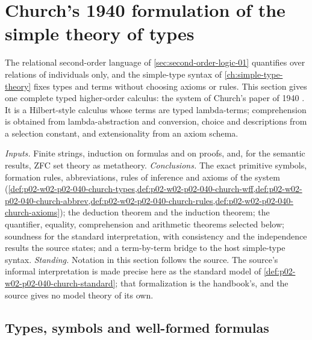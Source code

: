 \section{Church's 1940 formulation of the simple theory of types}
\label{sec:p02-w02-p02-040-church}

The relational second-order language of
\cref{sec:second-order-logic-01} quantifies over relations of individuals
only, and the simple-type syntax of \cref{ch:simple-type-theory} fixes types
and terms without choosing axioms or rules.  This section gives one complete
typed higher-order calculus: the system of Church's paper of 1940
\cite{Church1940}.  It is a Hilbert-style calculus whose terms are typed
lambda-terms; comprehension is obtained from lambda-abstraction and
conversion, choice and descriptions from a selection constant, and
extensionality from an axiom schema.

\emph{Inputs.}  Finite strings, induction on formulas and on proofs, and, for the
semantic results, ZFC set theory as metatheory.
\emph{Conclusions.}  The exact primitive symbols, formation rules,
abbreviations, rules of inference and axioms of the system
(\cref{def:p02-w02-p02-040-church-types,def:p02-w02-p02-040-church-wff,def:p02-w02-p02-040-church-abbrev,def:p02-w02-p02-040-church-rules,def:p02-w02-p02-040-church-axioms});
the deduction theorem and the induction theorem; the quantifier, equality,
comprehension and arithmetic theorems selected below; soundness for the
standard interpretation, with consistency and the independence results
the source states; and a term-by-term bridge to the host simple-type syntax.
\emph{Standing.}  Notation in this section follows the source.  The
source's informal interpretation is made precise here as the standard model
of \cref{def:p02-w02-p02-040-church-standard}; that formalization is the
handbook's, and the source gives no model theory of its own.

\subsection{Types, symbols and well-formed formulas}

